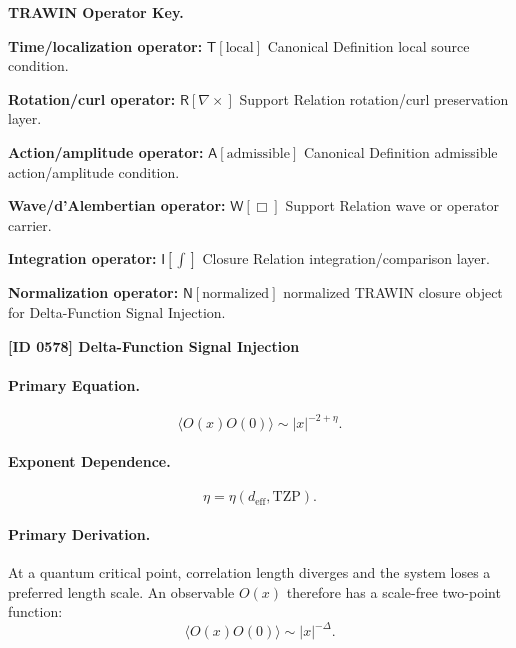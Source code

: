 \par\vspace{0.45\baselineskip}
\noindent\begin{minipage}[t]{\linewidth}
\begingroup
\small
\raggedright
\textbf{TRAWIN Operator Key.}\par
\noindent\textbf{Time/localization operator:} $\mathsf{T}\!\left[\mathrm{local}\right]$ Canonical Definition local source condition.\par
\noindent\textbf{Rotation/curl operator:} $\mathsf{R}\!\left[\nabla\times\right]$ Support Relation rotation/curl preservation layer.\par
\noindent\textbf{Action/amplitude operator:} $\mathsf{A}\!\left[\mathrm{admissible}\right]$ Canonical Definition admissible action/amplitude condition.\par
\noindent\textbf{Wave/d'Alembertian operator:} $\mathsf{W}\!\left[\Box\right]$ Support Relation wave or operator carrier.\par
\noindent\textbf{Integration operator:} $\mathsf{I}\!\left[\int\right]$ Closure Relation integration/comparison layer.\par
\noindent\textbf{Normalization operator:} $\mathsf{N}\!\left[\mathrm{normalized}\right]$ normalized TRAWIN closure object for Delta-Function Signal Injection.\par
\endgroup
\end{minipage}

\clearpage
\noindent\textbf{[ID 0578] Delta-Function Signal Injection}\par
\vspace{0.35em}
\paragraph{Primary Equation.}
\begin{equation}
\langle O(x)O(0)\rangle
\sim
|x|^{-2+\eta}.
\end{equation}

\paragraph{Exponent Dependence.}
\begin{equation}
\eta=\eta(d_{\mathrm{eff}},\mathrm{TZP}).
\end{equation}

\paragraph{Primary Derivation.}
At a quantum critical point, correlation length diverges and the system loses a preferred length scale.  
An observable $O(x)$ therefore has a scale-free two-point function:
\begin{equation}
\langle O(x)O(0)\rangle
\sim
|x|^{-\Delta}.
\end{equation}

